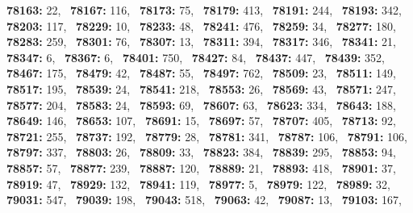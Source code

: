 \textbf{78163:} 22,\allowbreak~ 
\textbf{78167:} 116,\allowbreak~ 
\textbf{78173:} 75,\allowbreak~ 
\textbf{78179:} 413,\allowbreak~ 
\textbf{78191:} 244,\allowbreak~ 
\textbf{78193:} 342,\allowbreak~ 
\textbf{78203:} 117,\allowbreak~ 
\textbf{78229:} 10,\allowbreak~ 
\textbf{78233:} 48,\allowbreak~ 
\textbf{78241:} 476,\allowbreak~ 
\textbf{78259:} 34,\allowbreak~ 
\textbf{78277:} 180,\allowbreak~ 
\textbf{78283:} 259,\allowbreak~ 
\textbf{78301:} 76,\allowbreak~ 
\textbf{78307:} 13,\allowbreak~ 
\textbf{78311:} 394,\allowbreak~ 
\textbf{78317:} 346,\allowbreak~ 
\textbf{78341:} 21,\allowbreak~ 
\textbf{78347:} 6,\allowbreak~ 
\textbf{78367:} 6,\allowbreak~ 
\textbf{78401:} 750,\allowbreak~ 
\textbf{78427:} 84,\allowbreak~ 
\textbf{78437:} 447,\allowbreak~ 
\textbf{78439:} 352,\allowbreak~ 
\textbf{78467:} 175,\allowbreak~ 
\textbf{78479:} 42,\allowbreak~ 
\textbf{78487:} 55,\allowbreak~ 
\textbf{78497:} 762,\allowbreak~ 
\textbf{78509:} 23,\allowbreak~ 
\textbf{78511:} 149,\allowbreak~ 
\textbf{78517:} 195,\allowbreak~ 
\textbf{78539:} 24,\allowbreak~ 
\textbf{78541:} 218,\allowbreak~ 
\textbf{78553:} 26,\allowbreak~ 
\textbf{78569:} 43,\allowbreak~ 
\textbf{78571:} 247,\allowbreak~ 
\textbf{78577:} 204,\allowbreak~ 
\textbf{78583:} 24,\allowbreak~ 
\textbf{78593:} 69,\allowbreak~ 
\textbf{78607:} 63,\allowbreak~ 
\textbf{78623:} 334,\allowbreak~ 
\textbf{78643:} 188,\allowbreak~ 
\textbf{78649:} 146,\allowbreak~ 
\textbf{78653:} 107,\allowbreak~ 
\textbf{78691:} 15,\allowbreak~ 
\textbf{78697:} 57,\allowbreak~ 
\textbf{78707:} 405,\allowbreak~ 
\textbf{78713:} 92,\allowbreak~ 
\textbf{78721:} 255,\allowbreak~ 
\textbf{78737:} 192,\allowbreak~ 
\textbf{78779:} 28,\allowbreak~ 
\textbf{78781:} 341,\allowbreak~ 
\textbf{78787:} 106,\allowbreak~ 
\textbf{78791:} 106,\allowbreak~ 
\textbf{78797:} 337,\allowbreak~ 
\textbf{78803:} 26,\allowbreak~ 
\textbf{78809:} 33,\allowbreak~ 
\textbf{78823:} 384,\allowbreak~ 
\textbf{78839:} 295,\allowbreak~ 
\textbf{78853:} 94,\allowbreak~ 
\textbf{78857:} 57,\allowbreak~ 
\textbf{78877:} 239,\allowbreak~ 
\textbf{78887:} 120,\allowbreak~ 
\textbf{78889:} 21,\allowbreak~ 
\textbf{78893:} 418,\allowbreak~ 
\textbf{78901:} 37,\allowbreak~ 
\textbf{78919:} 47,\allowbreak~ 
\textbf{78929:} 132,\allowbreak~ 
\textbf{78941:} 119,\allowbreak~ 
\textbf{78977:} 5,\allowbreak~ 
\textbf{78979:} 122,\allowbreak~ 
\textbf{78989:} 32,\allowbreak~ 
\textbf{79031:} 547,\allowbreak~ 
\textbf{79039:} 198,\allowbreak~ 
\textbf{79043:} 518,\allowbreak~ 
\textbf{79063:} 42,\allowbreak~ 
\textbf{79087:} 13,\allowbreak~ 
\textbf{79103:} 167,\allowbreak~ 
